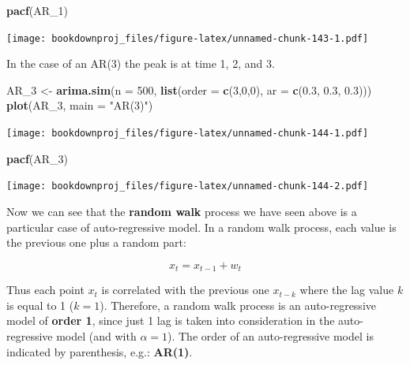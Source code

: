 \documentclass[
]{article}
\newenvironment{Shaded}{\begin{snugshade}}{\end{snugshade}}
\newcommand{\DataTypeTok}[1]{\textcolor[rgb]{0.13,0.29,0.53}{#1}}
\newcommand{\DecValTok}[1]{\textcolor[rgb]{0.00,0.00,0.81}{#1}}
\newcommand{\FloatTok}[1]{\textcolor[rgb]{0.00,0.00,0.81}{#1}}
\newcommand{\KeywordTok}[1]{\textcolor[rgb]{0.13,0.29,0.53}{\textbf{#1}}}
\newcommand{\NormalTok}[1]{#1}
\newcommand{\StringTok}[1]{\textcolor[rgb]{0.31,0.60,0.02}{#1}}
\begin{document}
\begin{Shaded}
\begin{Highlighting}[]
\KeywordTok{pacf}\NormalTok{(AR_}\DecValTok{1}\NormalTok{)}
\end{Highlighting}
\end{Shaded}

\texttt{[image: bookdownproj\_files/figure-latex/unnamed-chunk-143-1.pdf]}

In the case of an AR(3) the peak is at time 1, 2, and 3.

\begin{Shaded}
\begin{Highlighting}[]
\NormalTok{AR_}\DecValTok{3}\NormalTok{ <-}\StringTok{ }\KeywordTok{arima.sim}\NormalTok{(}\DataTypeTok{n =} \DecValTok{500}\NormalTok{, }\KeywordTok{list}\NormalTok{(}\DataTypeTok{order =} \KeywordTok{c}\NormalTok{(}\DecValTok{3}\NormalTok{,}\DecValTok{0}\NormalTok{,}\DecValTok{0}\NormalTok{), }\DataTypeTok{ar =} \KeywordTok{c}\NormalTok{(}\FloatTok{0.3}\NormalTok{, }\FloatTok{0.3}\NormalTok{, }\FloatTok{0.3}\NormalTok{)))}
\KeywordTok{plot}\NormalTok{(AR_}\DecValTok{3}\NormalTok{, }\DataTypeTok{main =} \StringTok{"AR(3)"}\NormalTok{)}
\end{Highlighting}
\end{Shaded}

\texttt{[image: bookdownproj\_files/figure-latex/unnamed-chunk-144-1.pdf]}

\begin{Shaded}
\begin{Highlighting}[]
\KeywordTok{pacf}\NormalTok{(AR_}\DecValTok{3}\NormalTok{)}
\end{Highlighting}
\end{Shaded}

\texttt{[image: bookdownproj\_files/figure-latex/unnamed-chunk-144-2.pdf]}

Now we can see that the \textbf{random walk} process we have seen above is a particular case of auto-regressive model. In a random walk process, each value is the previous one plus a random part:

\[
x_t = x_{t-1} + w_t
\]

Thus each point \(x_t\) is correlated with the previous one \(x_{t-k}\) where the lag value \(k\) is equal to 1 (\({k=1}\)). Therefore, a random walk process is an auto-regressive model of \textbf{order 1}, since just 1 lag is taken into consideration in the auto-regressive model (and with \(\alpha = 1\)). The order of an auto-regressive model is indicated by parenthesis, e.g.: \textbf{AR(1)}.
\end{document}
